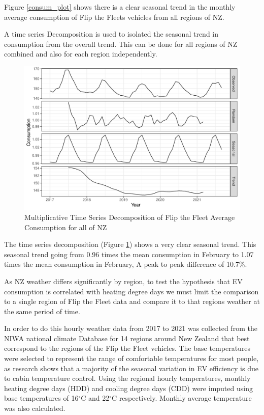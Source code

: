 \documentclass[
]{article}
\begin{document}
Figure \ref{consum_plot} shows there is a clear seasonal trend in the
monthly average consumption of Flip the Fleets vehicles from all regions
of NZ.

A time series Decomposition is used to isolated the seasonal trend in
consumption from the overall trend. This can be done for all regions of
NZ combined and also for each region independently.

\begin{figure}
\centering
\includegraphics{final_report_files/figure-latex/consum_decomp_plot-1.pdf}
\caption{Multiplicative Time Series Decomposition of Flip the Fleet
Average Consumption for all of NZ\label{fig:consum_decomp_plot}}
\end{figure}

The time series decomposition (Figure \ref{fig:consum_decomp_plot})
shows a very clear seasonal trend. This seasonal trend going from 0.96
times the mean consumption in February to 1.07 times the mean
consumption in February, A peak to peak difference of 10.7\%.

As NZ weather differs significantly by region, to test the hypothesis
that EV consumption is correlated with heating degree days we must limit
the comparison to a single region of Flip the Fleet data and compare it
to that regions weather at the same period of time.

In order to do this hourly weather data from 2017 to 2021 was collected
from the NIWA national climate Database for 14 regions around New
Zealand that best correspond to the regions of the Flip the Fleet
vehicles. The base temperatures were selected to represent the range of
comfortable temperatures for most people, as research shows that a
majority of the seasonal variation in EV efficiency is due to cabin
temperature control\cite{ev_range}. Using the regional hourly
temperatures, monthly heating degree days (HDD) and cooling degree days
(CDD) were imputed using base temperatures of 16\(^\circ\)C and
22\(^\circ\)C respectively. Monthly average temperature was also
calculated.
\end{document}
